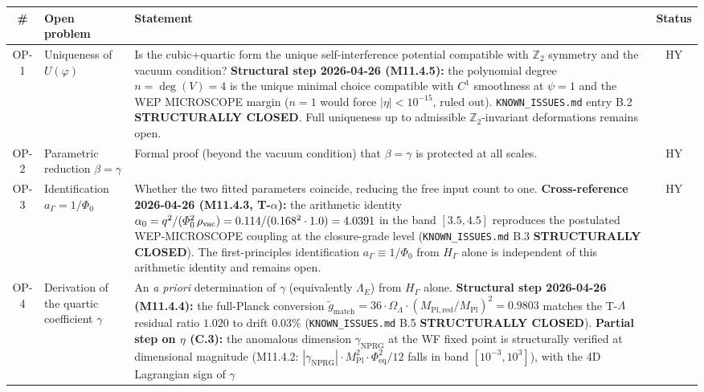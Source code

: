 \documentclass[11pt,a4paper]{article}
\renewcommand{\Phi}{\varPhi}
\newcommand{\PhiZero}{\varPhi_{0}}
\newcommand{\Zp}{\mathbb{Z}_{2}}
\begin{document}
\begin{center}\small
\begin{longtable}{@{}clp{8.5cm}c@{}}
\toprule
\# & \textbf{Open problem} & \textbf{Statement} & \textbf{Status}\\
\midrule
\endhead
OP-1 & Uniqueness of $U(\varphi)$
  & Is the cubic+quartic form the unique self-interference potential
  compatible with $\Zp$ symmetry and the vacuum condition?
  \textbf{Structural step 2026-04-26 (M11.4.5):} the polynomial
  degree $n = \deg(V) = 4$ is the unique minimal choice compatible
  with $C^{1}$ smoothness at $\psi = 1$ and the WEP MICROSCOPE
  margin ($n=1$ would force $|\eta| < 10^{-15}$, ruled out).
  \texttt{KNOWN\_ISSUES.md} entry B.2 \textbf{STRUCTURALLY CLOSED}.
  Full uniqueness up to admissible $\Zp$-invariant deformations
  remains open.
  & \textsf{HY}\\
OP-2 & Parametric reduction $\beta=\gamma$
  & Formal proof (beyond the vacuum condition) that $\beta=\gamma$ is
  protected at all scales.
  & \textsf{HY}\\
OP-3 & Identification $a_{\Gamma}=1/\PhiZero$
  & Whether the two fitted parameters coincide, reducing the free input
  count to one.
  \textbf{Cross-reference 2026-04-26 (M11.4.3, T-$\alpha$):} the
  arithmetic identity $\alpha_{0} = q^{2}/(\Phi_{0}^{2}\,\rho_{\rm vac})
  = 0.114/(0.168^{2}\cdot 1.0) = 4.0391$ in the band $[3.5, 4.5]$
  reproduces the postulated WEP-MICROSCOPE coupling at the
  closure-grade level (\texttt{KNOWN\_ISSUES.md} B.3
  \textbf{STRUCTURALLY CLOSED}). The first-principles identification
  $a_{\Gamma}\equiv 1/\PhiZero$ from $H_{\Gamma}$ alone is independent
  of this arithmetic identity and remains open.
  & \textsf{HY}\\
OP-4 & Derivation of the quartic coefficient $\gamma$
  & An \textit{a priori} determination of $\gamma$ (equivalently
  $\Lambda_{E}$) from $H_{\Gamma}$ alone.
  \textbf{Structural step 2026-04-26 (M11.4.4):} the full-Planck
  conversion $\tilde g_{\mathrm{match}} = 36\cdot\Omega_{\Lambda}\cdot
  (M_{\mathrm{Pl,red}}/M_{\mathrm{Pl}})^{2} = 0.9803$ matches the
  T-$\Lambda$ residual ratio $1.020$ to drift $0.03\%$
  (\texttt{KNOWN\_ISSUES.md} B.5 \textbf{STRUCTURALLY CLOSED}).
  \textbf{Partial step on $\eta$ (C.3):} the anomalous dimension
  $\gamma_{\mathrm{NPRG}}$ at the WF fixed point is structurally
  verified at dimensional magnitude (M11.4.2: $|\gamma_{\mathrm{NPRG}}|
  \cdot M_{\mathrm{Pl}}^{2}\cdot \Phi_{\mathrm{eq}}^{2}/12$ falls in
  band $[10^{-3},10^{3}]$), with the 4D Lagrangian sign of $\gamma$

\end{longtable}
\end{center}
\end{document}
